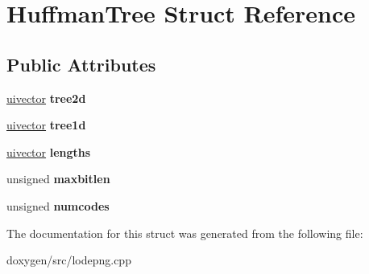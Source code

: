 \hypertarget{struct_huffman_tree}{}\section{Huffman\+Tree Struct Reference}
\label{struct_huffman_tree}
\subsection*{Public Attributes}
\begin{DoxyCompactItemize}
\item 
\mbox{\label{struct_huffman_tree_a24afa4a1079f6ee1c9829b9b5aa5fe89}} 
\mbox{\hyperlink{structuivector}{uivector}} {\bfseries tree2d}
\item 
\mbox{\label{struct_huffman_tree_a0bb5fd80eb9ec029f66cf30641b98363}} 
\mbox{\hyperlink{structuivector}{uivector}} {\bfseries tree1d}
\item 
\mbox{\label{struct_huffman_tree_a293790e0f67d8fdf9df5a2914af39251}} 
\mbox{\hyperlink{structuivector}{uivector}} {\bfseries lengths}
\item 
\mbox{\label{struct_huffman_tree_adf034ca9ce62a4ebfffaaeaba4378a26}} 
unsigned {\bfseries maxbitlen}
\item 
\mbox{\label{struct_huffman_tree_a608df5a24f60d1077a5cde19d5149e1f}} 
unsigned {\bfseries numcodes}
\end{DoxyCompactItemize}


The documentation for this struct was generated from the following file\+:\begin{DoxyCompactItemize}
\item 
doxygen/src/lodepng.\+cpp\end{DoxyCompactItemize}
